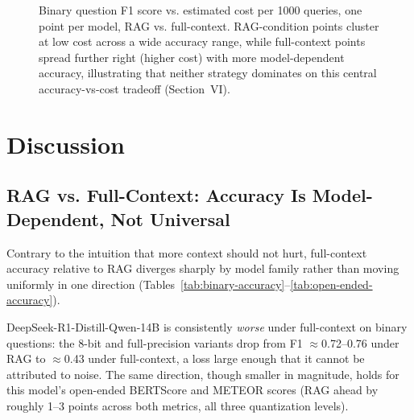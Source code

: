 \documentclass[conference]{IEEEtran}
\begin{document}

\begin{figure}[H]
\centering
{}
\caption{Binary question F1 score vs. estimated cost per 1000 queries, one point per model, RAG vs. full-context. RAG-condition points cluster at low cost across a wide accuracy range, while full-context points spread further right (higher cost) with more model-dependent accuracy, illustrating that neither strategy dominates on this central accuracy-vs-cost tradeoff (Section~VI).}
\label{fig:accuracy-cost-tradeoff}
\end{figure}

\section{Discussion}

\subsection{RAG vs. Full-Context: Accuracy Is Model-Dependent, Not Universal}

Contrary to the intuition that more context should not hurt, full-context accuracy relative to RAG diverges sharply by model family rather than moving uniformly in one direction (Tables~\ref{tab:binary-accuracy}--\ref{tab:open-ended-accuracy}).

DeepSeek-R1-Distill-Qwen-14B is consistently \textit{worse} under full-context on binary questions: the 8-bit and full-precision variants drop from F1 $\approx$0.72--0.76 under RAG to $\approx$0.43 under full-context, a loss large enough that it cannot be attributed to noise.
The same direction, though smaller in magnitude, holds for this model's open-ended BERTScore and METEOR scores (RAG ahead by roughly 1--3 points across both metrics, all three quantization levels).
\end{document}
